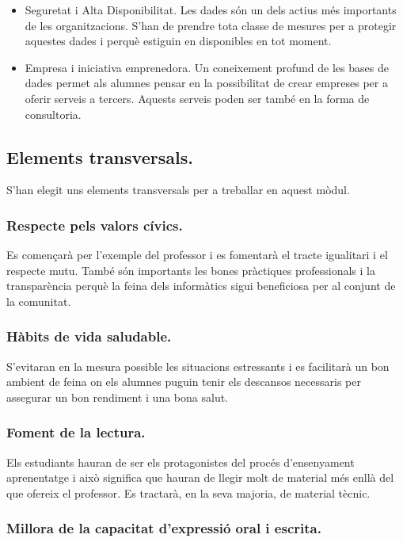 \documentclass[catalan, a4paper, 12pt, titlepage]{article}
\begin{document}
\begin{itemize}
	\item Seguretat i Alta Disponibilitat. Les dades són un dels actius més importants de les organitzacions. S'han de prendre tota classe de mesures per a protegir aquestes dades i perquè estiguin en disponibles en tot moment.
	\item Empresa i iniciativa emprenedora. Un coneixement profund de les bases de dades permet als alumnes pensar en la possibilitat de crear empreses per a oferir serveis a tercers. Aquests serveis poden ser també en la forma de consultoria.
\end{itemize}

\subsection{Elements transversals.}

S'han elegit uns elements transversals per a treballar en aquest mòdul.

\subsubsection{Respecte pels valors cívics.}

Es començarà per l'exemple del professor i es fomentarà el tracte igualitari i el respecte mutu. També són importants les bones pràctiques professionals i la transparència perquè la feina dels informàtics sigui beneficiosa per al conjunt de la comunitat.

\subsubsection{Hàbits de vida saludable.}

S'evitaran en la mesura possible les situacions estressants i es facilitarà un bon ambient de feina on els alumnes puguin tenir els descansos necessaris per assegurar un bon rendiment i una bona salut.

\subsubsection{Foment de la lectura.}

Els estudiants hauran de ser els protagonistes del procés d'ensenyament aprenentatge i això significa que hauran de llegir molt de material més enllà del que ofereix el professor. Es tractarà, en la seva majoria, de material tècnic.

\subsubsection{Millora de la capacitat d'expressió oral i escrita.}
\end{document}
